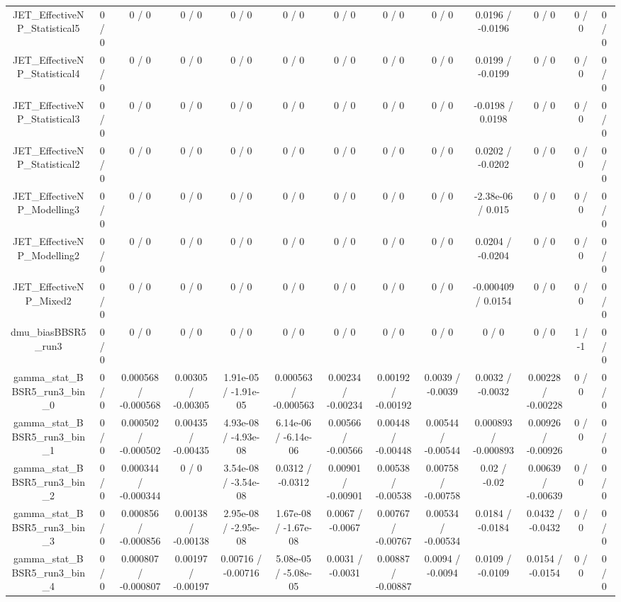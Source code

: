 \documentclass[10pt]{article}
\begin{document}
\begin{table}[htbp]
\begin{center}
\begin{tabular}{|c|c|c|c|c|c|c|c|c|c|c|c|c|}
  JET_EffectiveNP_Statistical5 & 0 / 0 & 0 / 0 & 0 / 0 & 0 / 0 & 0 / 0 & 0 / 0 & 0 / 0 & 0 / 0 & 0.0196 / -0.0196 & 0 / 0 & 0 / 0 & 0 / 0 \\ 
  JET_EffectiveNP_Statistical4 & 0 / 0 & 0 / 0 & 0 / 0 & 0 / 0 & 0 / 0 & 0 / 0 & 0 / 0 & 0 / 0 & 0.0199 / -0.0199 & 0 / 0 & 0 / 0 & 0 / 0 \\ 
  JET_EffectiveNP_Statistical3 & 0 / 0 & 0 / 0 & 0 / 0 & 0 / 0 & 0 / 0 & 0 / 0 & 0 / 0 & 0 / 0 & -0.0198 / 0.0198 & 0 / 0 & 0 / 0 & 0 / 0 \\ 
  JET_EffectiveNP_Statistical2 & 0 / 0 & 0 / 0 & 0 / 0 & 0 / 0 & 0 / 0 & 0 / 0 & 0 / 0 & 0 / 0 & 0.0202 / -0.0202 & 0 / 0 & 0 / 0 & 0 / 0 \\ 
  JET_EffectiveNP_Modelling3 & 0 / 0 & 0 / 0 & 0 / 0 & 0 / 0 & 0 / 0 & 0 / 0 & 0 / 0 & 0 / 0 & -2.38e-06 / 0.015 & 0 / 0 & 0 / 0 & 0 / 0 \\ 
  JET_EffectiveNP_Modelling2 & 0 / 0 & 0 / 0 & 0 / 0 & 0 / 0 & 0 / 0 & 0 / 0 & 0 / 0 & 0 / 0 & 0.0204 / -0.0204 & 0 / 0 & 0 / 0 & 0 / 0 \\ 
  JET_EffectiveNP_Mixed2 & 0 / 0 & 0 / 0 & 0 / 0 & 0 / 0 & 0 / 0 & 0 / 0 & 0 / 0 & 0 / 0 & -0.000409 / 0.0154 & 0 / 0 & 0 / 0 & 0 / 0 \\ 
  dmu_biasBBSR5_run3 & 0 / 0 & 0 / 0 & 0 / 0 & 0 / 0 & 0 / 0 & 0 / 0 & 0 / 0 & 0 / 0 & 0 / 0 & 0 / 0 & 1 / -1 & 0 / 0 \\ 
  gamma_stat_BBSR5_run3_bin_0 & 0 / 0 & 0.000568 / -0.000568 & 0.00305 / -0.00305 & 1.91e-05 / -1.91e-05 & 0.000563 / -0.000563 & 0.00234 / -0.00234 & 0.00192 / -0.00192 & 0.0039 / -0.0039 & 0.0032 / -0.0032 & 0.00228 / -0.00228 & 0 / 0 & 0 / 0 \\ 
  gamma_stat_BBSR5_run3_bin_1 & 0 / 0 & 0.000502 / -0.000502 & 0.00435 / -0.00435 & 4.93e-08 / -4.93e-08 & 6.14e-06 / -6.14e-06 & 0.00566 / -0.00566 & 0.00448 / -0.00448 & 0.00544 / -0.00544 & 0.000893 / -0.000893 & 0.00926 / -0.00926 & 0 / 0 & 0 / 0 \\ 
  gamma_stat_BBSR5_run3_bin_2 & 0 / 0 & 0.000344 / -0.000344 & 0 / 0 & 3.54e-08 / -3.54e-08 & 0.0312 / -0.0312 & 0.00901 / -0.00901 & 0.00538 / -0.00538 & 0.00758 / -0.00758 & 0.02 / -0.02 & 0.00639 / -0.00639 & 0 / 0 & 0 / 0 \\ 
  gamma_stat_BBSR5_run3_bin_3 & 0 / 0 & 0.000856 / -0.000856 & 0.00138 / -0.00138 & 2.95e-08 / -2.95e-08 & 1.67e-08 / -1.67e-08 & 0.0067 / -0.0067 & 0.00767 / -0.00767 & 0.00534 / -0.00534 & 0.0184 / -0.0184 & 0.0432 / -0.0432 & 0 / 0 & 0 / 0 \\ 
  gamma_stat_BBSR5_run3_bin_4 & 0 / 0 & 0.000807 / -0.000807 & 0.00197 / -0.00197 & 0.00716 / -0.00716 & 5.08e-05 / -5.08e-05 & 0.0031 / -0.0031 & 0.00887 / -0.00887 & 0.0094 / -0.0094 & 0.0109 / -0.0109 & 0.0154 / -0.0154 & 0 / 0 & 0 / 0 \\ 

\end{tabular}
\end{center}
\end{table}
\end{document}
